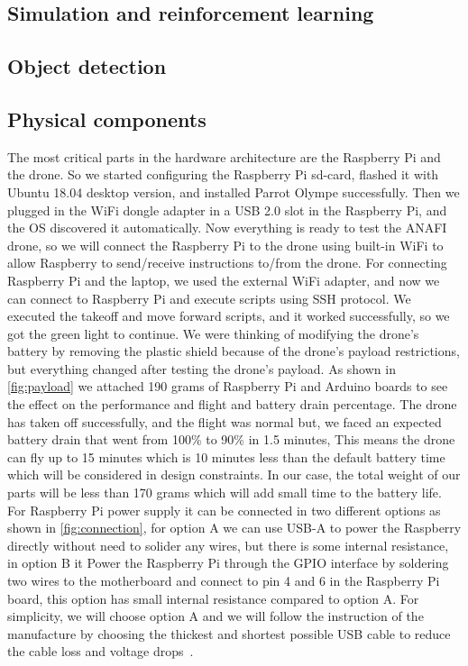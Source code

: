 \documentclass[../main.tex]{subfiles}
\begin{document}
\subsection{Simulation and reinforcement learning}

\lipsum[1]

\subsection{Object detection}

\lipsum[1]

\subsection{Physical components}
The most critical parts in the hardware
architecture are the Raspberry Pi and the drone. 
So we started configuring the Raspberry Pi sd-card,
flashed it with Ubuntu 18.04 desktop version,
and installed Parrot Olympe successfully. 
Then we plugged in the WiFi dongle adapter
in a USB 2.0 slot in the Raspberry Pi, 
and the OS discovered it automatically. 
Now everything is ready to test the 
\textsc{ANAFI} drone, so we will connect the
Raspberry Pi to the drone using built-in WiFi
to allow Raspberry to send/receive instructions
to/from the drone. 
For connecting Raspberry Pi and the laptop, 
we used the external WiFi adapter,
and now we can connect to Raspberry Pi and execute 
scripts using SSH protocol.
We executed the takeoff and move forward scripts,
and it worked successfully, so we got the green 
light to continue. 
We were thinking of modifying the drone's battery
by removing the plastic shield because of the drone's
payload restrictions, but everything changed after 
testing the drone's payload. As shown in \cref{fig:payload}
we attached 190 grams of Raspberry Pi and Arduino boards
to see the effect on the performance and flight and
battery drain percentage. 
The drone has taken off  successfully, 
and the flight was normal but, we faced an expected 
battery drain that went from 100\% to 90\% in 1.5 minutes,
This means the drone can fly up to 15 minutes which is 
10 minutes less than the default battery time 
which will be considered in design constraints.
In our case, the total weight of our parts will be 
less than 170 grams which will add small time
to the battery life.
For Raspberry Pi power supply it can be connected in 
two different options as shown in \cref{fig:connection},
for option A we can use USB-A to power the Raspberry directly without
need to solider any wires,
but there is some internal resistance,
in option B it Power the Raspberry Pi through the GPIO 
interface by soldering two wires to the motherboard and 
connect to pin 4 and 6 in the Raspberry Pi board,
this option has small internal resistance compared to option A.
For simplicity, we will choose option A and we will 
follow the instruction of the manufacture by choosing 
the thickest and shortest possible USB cable to reduce 
the cable loss and voltage drops~\cite{makerfocus}. 	 
\end{document}
